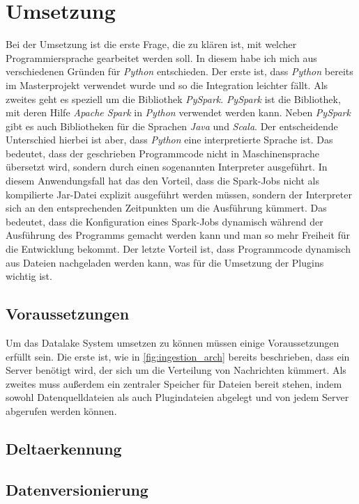 \chapter{Umsetzung}

Bei der Umsetzung ist die erste Frage, die zu klären ist, mit welcher Programmiersprache gearbeitet werden soll.
In diesem habe ich mich aus verschiedenen Gründen für \textit{Python} entschieden.
Der erste ist, dass \textit{Python} bereits im Masterprojekt verwendet wurde und so die Integration leichter fällt.
Als zweites geht es speziell um die Bibliothek \textit{PySpark}.
\textit{PySpark} ist die Bibliothek, mit deren Hilfe \textit{Apache Spark} in \textit{Python} verwendet werden kann.
Neben \textit{PySpark} gibt es auch Bibliotheken für die Sprachen \textit{Java} und \textit{Scala}.
Der entscheidende Unterschied hierbei ist aber, dass \textit{Python} eine interpretierte Sprache ist.
Das bedeutet, dass der geschrieben Programmcode nicht in Maschinensprache übersetzt wird, sondern durch einen sogenannten Interpreter ausgeführt.
In diesem Anwendungsfall hat das den Vorteil, dass die Spark-Jobs nicht als kompilierte Jar-Datei explizit ausgeführt werden müssen, sondern der Interpreter sich an den entsprechenden Zeitpunkten um die Ausführung kümmert.
Das bedeutet, dass die Konfiguration eines Spark-Jobs dynamisch während der Ausführung des Programms gemacht werden kann und man so mehr Freiheit für die Entwicklung bekommt.
Der letzte Vorteil ist, dass Programmcode dynamisch aus Dateien nachgeladen werden kann, was für die Umsetzung der Plugins wichtig ist.

\section{Voraussetzungen}
Um das Datalake System umsetzen zu können müssen einige Voraussetzungen erfüllt sein.
Die erste ist, wie in \ref{fig:ingestion_arch} bereits beschrieben, dass ein Server benötigt wird, der sich um die Verteilung von Nachrichten kümmert.
Als zweites muss außerdem ein zentraler Speicher für Dateien bereit stehen, indem sowohl Datenquelldateien als auch Plugindateien abgelegt und von jedem Server abgerufen werden können.



\section{Deltaerkennung}

\section{Datenversionierung}